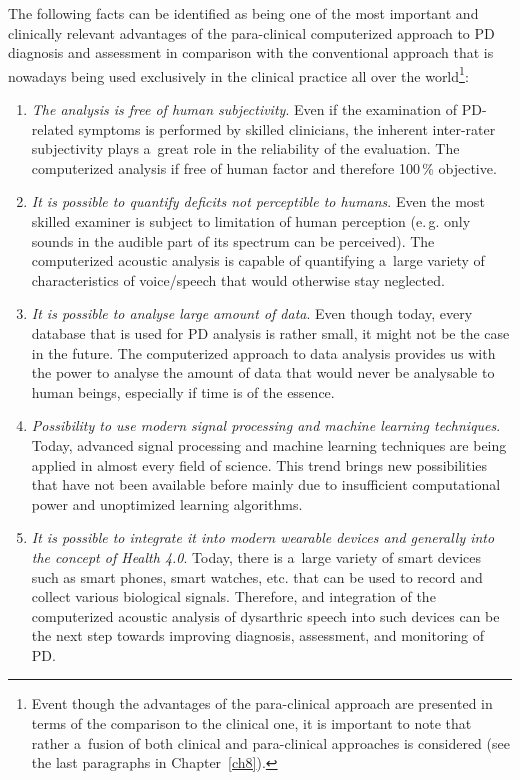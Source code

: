 The following facts can be identified as being one of the most important and clinically relevant advantages of the para-clinical computerized approach to PD diagnosis and assessment in comparison with the conventional approach that is nowadays being used exclusively in the clinical practice all over the world\footnote{Event though the advantages of the para-clinical approach are presented in terms of the comparison to the clinical one, it is important to note that rather a~fusion of both clinical and para-clinical approaches is considered (see the last paragraphs in Chapter~\ref{ch8}).}:
\begin{enumerate}
	\item \textit{The analysis is free of human subjectivity}. Even if the examination of PD-related symptoms is performed by skilled clinicians, the inherent inter-rater subjectivity plays a~great role in the reliability of the evaluation. The computerized analysis if free of human factor and therefore 100\,\% objective.
	\item \textit{It is possible to quantify deficits not perceptible to humans}. Even the most skilled examiner is subject to limitation of human perception (e.\,g. only sounds in the audible part of its spectrum can be perceived). The computerized acoustic analysis is capable of quantifying a~large variety of characteristics of voice/speech that would otherwise stay neglected.
	\item \textit{It is possible to analyse large amount of data}. Even though today, every database that is used for PD analysis is rather small, it might not be the case in the future. The computerized approach to data analysis provides us with the power to analyse the amount of data that would never be analysable to human beings, especially if time is of the essence.
	\item \textit{Possibility to use modern signal processing and machine learning techniques}. Today, advanced signal processing and machine learning techniques are being applied in almost every field of science. This trend brings new possibilities that have not been available before mainly due to insufficient computational power and unoptimized learning algorithms. 
	\item \textit{It is possible to integrate it into modern wearable devices and generally into the concept of Health 4.0}. Today, there is a~large variety of smart devices such as smart phones, smart watches, etc. that can be used to record and collect various biological signals. Therefore, and integration of the computerized acoustic analysis of dysarthric speech into such devices can be the next step towards improving diagnosis, assessment, and monitoring of PD.
\end{enumerate}
